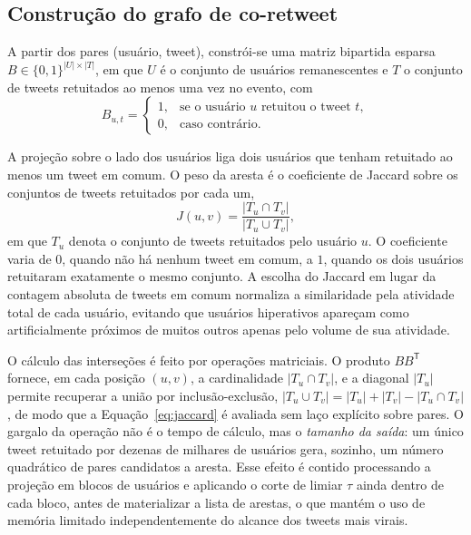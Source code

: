 \documentclass[conference]{IEEEtran}
\begin{document}
\subsection{Construção do grafo de co-retweet}
\label{sub:construcao}

A partir dos pares (usuário, tweet), constrói-se uma matriz bipartida esparsa $B \in \{0,1\}^{|U| \times |T|}$, em que $U$ é o conjunto de usuários remanescentes e $T$ o conjunto de tweets retuitados ao menos uma vez no evento, com
\begin{equation}
B_{u,t} =
\begin{cases}
1, & \text{se o usuário } u \text{ retuitou o tweet } t,\\
0, & \text{caso contrário.}
\end{cases}
\end{equation}

A projeção sobre o lado dos usuários liga dois usuários que tenham retuitado ao menos um tweet em comum. O peso da aresta é o coeficiente de Jaccard sobre os conjuntos de tweets retuitados por cada um,
\begin{equation}
J(u,v) = \frac{|T_u \cap T_v|}{|T_u \cup T_v|},
\label{eq:jaccard}
\end{equation}
em que $T_u$ denota o conjunto de tweets retuitados pelo usuário $u$. O coeficiente varia de $0$, quando não há nenhum tweet em comum, a $1$, quando os dois usuários retuitaram exatamente o mesmo conjunto. A escolha do Jaccard em lugar da contagem absoluta de tweets em comum normaliza a similaridade pela atividade total de cada usuário, evitando que usuários hiperativos apareçam como artificialmente próximos de muitos outros apenas pelo volume de sua atividade.

O cálculo das interseções é feito por operações matriciais. O produto $B B^{\mathsf{T}}$ fornece, em cada posição $(u,v)$, a cardinalidade $|T_u \cap T_v|$, e a diagonal $|T_u|$ permite recuperar a união por inclusão-exclusão, $|T_u \cup T_v| = |T_u| + |T_v| - |T_u \cap T_v|$, de modo que a Equação~\eqref{eq:jaccard} é avaliada sem laço explícito sobre pares. O gargalo da operação não é o tempo de cálculo, mas o \emph{tamanho da saída}: um único tweet retuitado por dezenas de milhares de usuários gera, sozinho, um número quadrático de pares candidatos a aresta. Esse efeito é contido processando a projeção em blocos de usuários e aplicando o corte de limiar $\tau$ ainda dentro de cada bloco, antes de materializar a lista de arestas, o que mantém o uso de memória limitado independentemente do alcance dos tweets mais virais.
\end{document}

